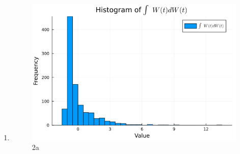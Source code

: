 \documentclass{article}
\begin{document}
\begin{enumerate}
    \item 
        \begin{figure}[H]
            \centering
            \includegraphics[scale=0.6]{imgs/2a.png}
            \caption{2a}
            \label{fig:2a}
        \end{figure}


\end{enumerate}
\end{document}
